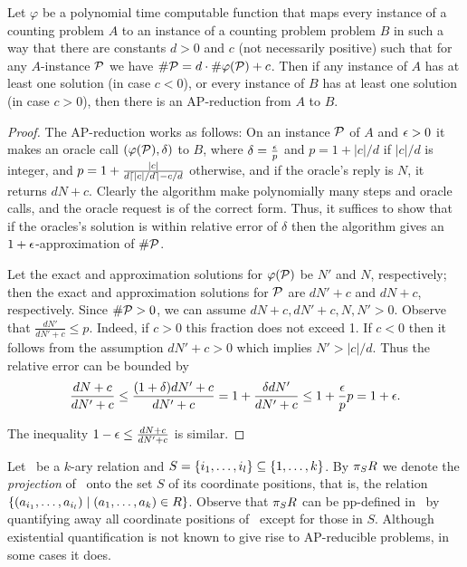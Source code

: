 \begin{lemma}\label{lem:linear}
Let \(\varphi\) be a polynomial time computable function that maps every instance of a
counting problem \(A\) to an instance of a counting problem problem \(B\) in such a way that
there are constants \(d > 0\) and \(c\) (not necessarily positive) such that
for any \(A\)-instance \(\mathcal{P}\) we have
\(\#\mathcal{P} = d\cdot \#\varphi(\mathcal{P}) + c\)\@. Then if any instance of \(A\)
has at least one solution 
(in case \(c < 0\)), or every instance of \(B\) has at least one solution (in case \(c>0\)), then
there is an AP-reduction from \(A\) to \(B\)\@.
\end{lemma}

\begin{proof}
The AP-reduction works as follows: On an instance \(\mathcal{P}\) of \(A\) and \(\epsilon > 0\) it makes 
an oracle call \((\varphi(\mathcal{P}),\delta)\) to \(B\), where \(\delta = \frac{\epsilon}{p}\) and 
\(p = 1 + |c|/d\) if \(|c|/d\) is integer, and \(p = 1 + \frac{|c|}{d\lceil|c|/d\rceil-c/d}\) otherwise,
and if the oracle's reply is \(N\), it returns \(dN + c\)\@. Clearly the algorithm make polynomially 
many steps and oracle calls, and the oracle request is of the correct form.
Thus, it suffices to show that if the oracles's solution is within relative error of \(\delta\) then
the algorithm gives an \(1+\epsilon\)-approximation of \(\#\mathcal{P}\)\@.

Let the exact and approximation solutions for \(\varphi(\mathcal{P})\) be \(N'\) and \(N\), respectively;
then the exact and approximation solutions for \(\mathcal{P}\) are 
\(dN' +c\) and \(dN + c\), respectively. Since \(\#\mathcal{P} > 0\), we can 
assume \(dN+c,dN'+c,N,N'>0\)\@. Observe that \(\frac{dN'}{dN'+c} \le p\)\@.
Indeed, if \(c > 0\) this fraction does not exceed 1\@. If \(c < 0\) then 
it follows from the assumption \(dN' + c > 0\) which implies \(N' > |c|/d\)\@.
Thus the relative error can be bounded by 
\[\frac{dN + c}{dN' + c} \le \frac{(1+\delta)dN' + c}{dN'+c} = 1 + \frac{\delta d N'}{d N' + c} \le 1 + \frac{\epsilon}{p}p = 1 + \epsilon.\]

The inequality \(1-\epsilon \le \frac{dN + c}{dN' + c}\) is similar.
\end{proof}

Let \mR\ be a \(k\)-ary relation and \(S=\{{i_1,\dotsc,i_l}\} \subseteq \{{1,\dotsc,k}\}\)\@.
By \(\pi_{S}{R}\) we denote the \emph{projection} of \mR\ onto the set \(S\) of its coordinate
positions, that is, the relation \(\{{(a_{i_1},\dotsc,a_{i_l}) \mid (a_1,\dotsc,a_k)\in R}\}\)\@.
Observe that \(\pi_{S}{R}\) can be pp-defined in \mR\ by quantifying away all coordinate positions of
\mR\ except for those in \(S\)\@.
Although existential quantification is not known to give rise to AP-reducible problems, in some
cases it does.

